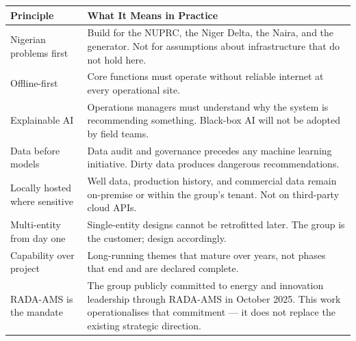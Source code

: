 \documentclass[10pt]{article}
\newcommand{\bigspacer}{\vspace{16pt}}
\begin{document}
\small
\begin{tabularx}{\columnwidth}{@{}lX@{}}
\toprule
\textbf{Principle} & \textbf{What It Means in Practice} \\
\midrule
Nigerian problems first
  & Build for the NUPRC, the Niger Delta, the Naira, and the generator.
    Not for assumptions about infrastructure that do not hold here. \\
Offline-first
  & Core functions must operate without reliable internet at every
    operational site. \\
Explainable AI
  & Operations managers must understand why the system is recommending
    something. Black-box AI will not be adopted by field teams. \\
Data before models
  & Data audit and governance precedes any machine learning initiative.
    Dirty data produces dangerous recommendations. \\
Locally hosted where sensitive
  & Well data, production history, and commercial data remain on-premise
    or within the group's tenant. Not on third-party cloud APIs. \\
Multi-entity from day one
  & Single-entity designs cannot be retrofitted later. The group is the
    customer; design accordingly. \\
Capability over project
  & Long-running themes that mature over years, not phases that end and
    are declared complete. \\
RADA-AMS is the mandate
  & The group publicly committed to energy and innovation leadership through
    RADA-AMS in October 2025. This work operationalises that commitment ---
    it does not replace the existing strategic direction. \\
\bottomrule
\end{tabularx}
\normalsize

\bigspacer
\end{document}
